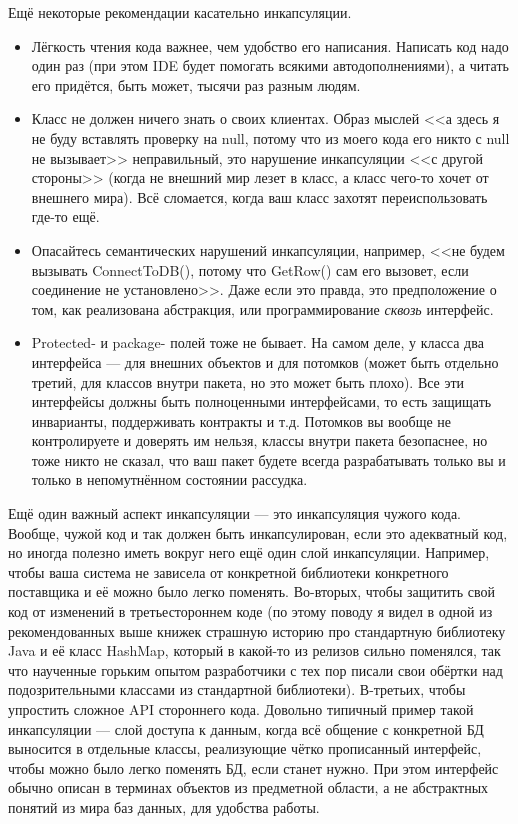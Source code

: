 \documentclass{../../text-style}
\begin{document}
Ещё некоторые рекомендации касательно инкапсуляции.

\begin{itemize}
    \item Лёгкость чтения кода важнее, чем удобство его написания. Написать код надо один раз (при этом IDE будет помогать всякими автодополнениями), а читать его придётся, быть может, тысячи раз разным людям.
    \item Класс не должен ничего знать о своих клиентах. Образ мыслей <<а здесь я не буду вставлять проверку на null, потому что из моего кода его никто с null не вызывает>> неправильный, это нарушение инкапсуляции <<с другой стороны>> (когда не внешний мир лезет в класс, а класс чего-то хочет от внешнего мира). Всё сломается, когда ваш класс захотят переиспользовать где-то ещё.
    \item Опасайтесь семантических нарушений инкапсуляции, например, <<не будем вызывать ConnectToDB(), потому что GetRow() сам его вызовет, если соединение не установлено>>. Даже если это правда, это предположение о том, как реализована абстракция, или программирование \textit{сквозь} интерфейс.
    \item Protected- и package- полей тоже не бывает. На самом деле, у класса два интерфейса --- для внешних объектов и для потомков (может быть отдельно третий, для классов внутри пакета, но это может быть плохо). Все эти интерфейсы должны быть полноценными интерфейсами, то есть защищать инварианты, поддерживать контракты и т.д. Потомков вы вообще не контролируете и доверять им нельзя, классы внутри пакета безопаснее, но тоже никто не сказал, что ваш пакет будете всегда разрабатывать только вы и только в непомутнённом состоянии рассудка.
\end{itemize}

Ещё один важный аспект инкапсуляции --- это инкапсуляция чужого кода. Вообще, чужой код и так должен быть инкапсулирован, если это адекватный код, но иногда полезно иметь вокруг него ещё один слой инкапсуляции. Например, чтобы ваша система не зависела от конкретной библиотеки конкретного поставщика и её можно было легко поменять. Во-вторых, чтобы защитить свой код от изменений в третьестороннем коде (по этому поводу я видел в одной из рекомендованных выше книжек страшную историю про стандартную библиотеку Java и её класс HashMap, который в какой-то из релизов сильно поменялся, так что наученные горьким опытом разработчики с тех пор писали свои обёртки над подозрительными классами из стандартной библиотеки). В-третьих, чтобы упростить сложное API стороннего кода. Довольно типичный пример такой инкапсуляции --- слой доступа к данным, когда всё общение с конкретной БД выносится в отдельные классы, реализующие чётко прописанный интерфейс, чтобы можно было легко поменять БД, если станет нужно. При этом интерфейс обычно описан в терминах объектов из предметной области, а не абстрактных понятий из мира баз данных, для удобства работы.
\end{document}
